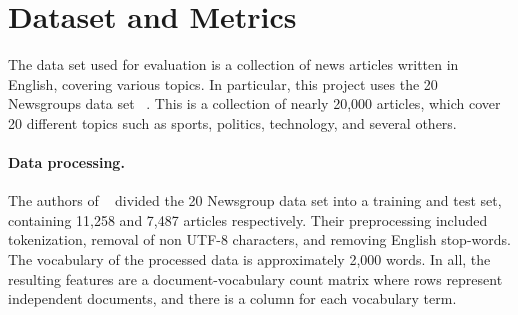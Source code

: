 \documentclass[10pt,twocolumn,letterpaper]{article}
\begin{document}
\section{Dataset and Metrics}
\noindent
The data set used for evaluation is a collection of news articles written in English, covering various topics. 
In particular, this project uses the 20 Newsgroups data set ~\cite{lang1995newsweeder}. 
This is a collection of nearly 20,000 articles, which cover 20 different topics such as sports, politics, technology, and several others. 

\paragraph{Data processing.} 
The authors of ~\cite{srivastava2017autoencoding} divided the 20 Newsgroup data set into a training and test set, containing 11,258 and 7,487 articles respectively. 
Their preprocessing included tokenization, removal of non UTF-8 characters, and removing English stop-words.
The vocabulary of the processed data is approximately 2,000 words.
In all, the resulting features are a document-vocabulary count matrix where rows represent independent documents, and there is a column for each vocabulary term.
\end{document}
